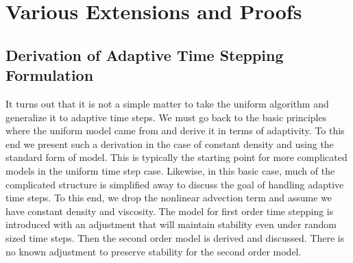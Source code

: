 \documentclass[letterpaper]{erdc}
\begin{document}
%
%
%
%
\chapter{Various Extensions and Proofs}

%
%
%
\section{Derivation of Adaptive Time Stepping Formulation}
\label{sec:VariableTimeSteppingAppendix}

It turns out that it is not a simple matter to take the uniform algorithm and
generalize it to adaptive time steps.  We must go back to the basic principles
where the uniform model came from and derive it in terms of adaptivity.  To
this end we present such a derivation in the case of constant density and using
the standard form of model.  This is typically the starting point for more
complicated models in the uniform time step case.  Likewise, in this basic
case, much of the complicated structure is simplified away to discuss the goal
of handling adaptive time steps.  To this end, we drop the nonlinear advection
term and assume we have constant density and viscosity.  The model for first
order time stepping is introduced with an adjustment that will maintain
stability even under random sized time steps.  Then the second order model is
derived and discussed.  There is no known adjustment to preserve stability for
the second order model.


%
%
\end{document}
